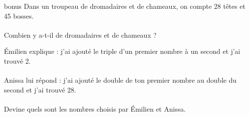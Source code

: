 \hfill
\parbox{.3\textwidth}{
	\begin{exercice*}{bonus}{}
		Dans un troupeau de dromadaires et de chameaux, on compte 28 têtes et 45 bosses.
		\\\\
		Combien y a-t-il de dromadaires et de chameaux ?
	\end{exercice*}	
}
\hfill
\parbox{.6\textwidth}{
	\begin{exercice}{}{}
		Émilien explique : \og j'ai ajouté le triple d'un premier nombre à un second et j'ai trouvé 2. \fg
		\\\\
		Anissa lui répond : \og j'ai ajouté le double de ton premier nombre au double du second et j'ai trouvé 28. \fg
		\\\\
		Devine quels sont les nombres choisis par Émilien et Anissa.
	\end{exercice}	
}




